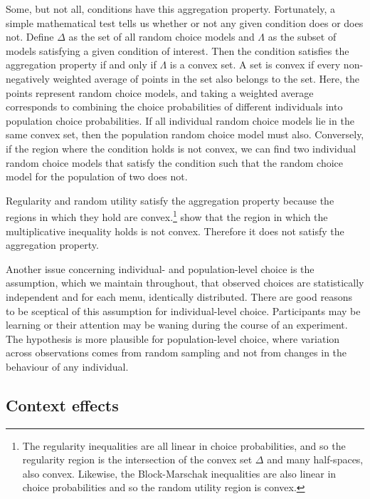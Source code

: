 \documentclass[11pt,letter]{article}
\newcommand{\menu}{menu}
\begin{document}
Some, but not all, conditions have this aggregation property.
Fortunately, a simple mathematical test tells us whether or not any given condition does or does not.
Define $\Delta$ as the set of all random choice models and $\Lambda$ as the subset of models satisfying a given condition of interest.
Then the condition satisfies the aggregation property if and only if $\Lambda$ is a convex set.
A set is convex if every non-negatively weighted average of points in the set also belongs to the set.
Here, the points represent random choice models, and taking a weighted average corresponds to combining the choice probabilities of different individuals into population choice probabilities.
If all individual random choice models lie in the same convex set, then the population random choice model must also.
Conversely, if the region where the condition holds is not convex, we can find two individual random choice models that satisfy the condition such that the random choice model for the population of two does not.

Regularity and random utility satisfy the aggregation property because the regions in which they hold are convex.\footnote{The regularity inequalities are all linear in choice probabilities, and so the regularity region is the intersection of the convex set $\Delta$ and many half-spaces, also convex.
Likewise, the Block-Marschak inequalities are also linear in choice probabilities and so the random utility region is convex.}
\citet{McCaMarl24} show that the region in which the multiplicative inequality holds is not convex.
Therefore it does not satisfy the aggregation property.

Another issue concerning individual- and population-level choice is the assumption, which we maintain throughout, that observed choices are statistically independent and for each \menu{}, identically distributed.
There are good reasons to be sceptical of this assumption for individual-level choice.
Participants may be learning or their attention may be waning during the course of an experiment.
The hypothesis is more plausible for population-level choice, where variation across observations comes from random sampling and not from changes in the behaviour of any individual.

\subsection{Context effects}\label{s:context_effects}
\end{document}

